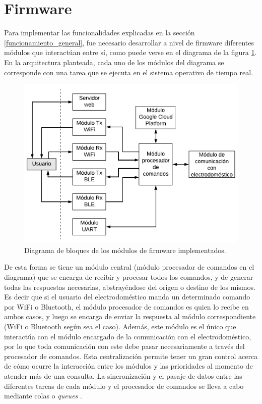 \section{Firmware}

Para implementar las funcionalidades explicadas en la sección \ref{funcionamiento_general}, fue necesario desarrollar a nivel de firmware diferentes módulos que interactúan entre sí, como puede verse en el diagrama de la figura \ref{fig:fw_diagram}. En la arquitectura planteada, cada uno de los módulos del diagrama se corresponde con una tarea que se ejecuta en el sistema operativo de tiempo real. 

\begin{figure}[h]
\centering
\includegraphics[width=\textwidth]{./Figures/firmware_diagram.pdf}
\caption{Diagrama de bloques de los módulos de firmware implementados.}
\label{fig:fw_diagram}
\end{figure}

De esta forma se tiene un módulo central (módulo procesador de comandos en el diagrama) que se encarga de recibir y procesar todos los comandos, y de generar todas las respuestas necesarias, abstrayéndose del origen o destino de los mismos. Es decir que si el usuario del electrodoméstico manda un determinado comando por WiFi o Bluetooth, el módulo procesador de comandos es quien lo recibe en ambos casos, y luego se encarga de enviar la respuesta al módulo correspondiente (WiFi o Bluetooth según sea el caso). Además, este módulo es el único que interactúa con el módulo encargado de la comunicación con el electrodoméstico, por lo que toda comunicación con este debe pasar necesariamente a través del procesador de comandos. Esta centralización permite tener un gran control acerca de cómo ocurre la interacción entre los módulos y las prioridades al momento de atender más de una consulta. La sincronización y el pasaje de datos entre las diferentes tareas de cada módulo y el procesador de comandos se lleva a cabo mediante colas o \emph{queues} \citep{freertos_queues}.

